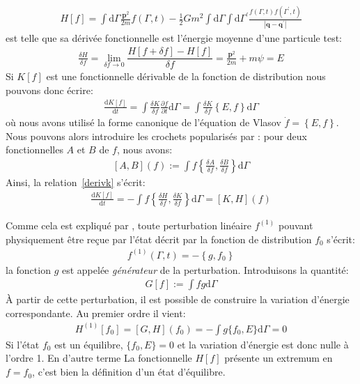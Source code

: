 \begin{align*}
	H \left[ f \right]  =
	\int \mathrm{d} {\Gamma}
		\frac{\mathbf{p}^{2}}{2m} f \left( {\Gamma},t \right)
	- \frac{1}{2} Gm^2 \int \mathrm{d} {\Gamma} \int\mathrm{d}{\Gamma}^{\prime}
		\frac{f \left({\Gamma},t \right) f\left( {\Gamma}^{\prime},t\right)}%
		{\left\vert \mathbf{q} - \mathbf{q}^{\prime} \right\vert }
\end{align*}
est telle que sa dérivée fonctionnelle est l'énergie moyenne d'une particule test:
\begin{align*}
	\frac{\delta H}{\delta f}=\lim_{\delta f \to 0}\dfrac{H\left[ f +\delta f\right]-H \left[ f \right]}{\delta f}
	= \frac{\mathbf{p}^{2}}{2m} + m \psi=E
\end{align*}
Si $K[f]$ est une fonctionnelle dérivable de la fonction de distribution nous pouvons donc écrire:
\begin{align}
	\frac{\mathrm{d} K[f]}{\mathrm{d} t}
	= \int \frac{\delta K}{\delta f}
		\frac{\partial f}{\partial t} \mathrm{d} \Gamma
	= \int \frac{\delta K}{\delta f} \left\{ E, f \right\} \mathrm{d} \Gamma
	\label{derivk}
\end{align}
où nous avons utilisé la forme canonique de l'équation de Vlasov $\dot f=\left\{ E, f \right\}$.
Nous pouvons alors introduire les crochets popularisés par \cite{morrison}: pour deux fonctionnelles $A$ et $B$ de $f$, nous avons:
\begin{align*}
	\left[ A, B \right](f) :=
	\int f \left\{
		\frac{\delta A}{\delta f}, \frac{\delta B}{\delta f}
	\right\} \mathrm{d} \Gamma
\end{align*}
Ainsi, la relation~\ref{derivk} s'écrit:
\begin{align}
	\frac{\mathrm{d} K[f]}{\mathrm{d} t}
	= - \int f \left\{
		\frac{\delta H}{\delta f}, \frac{\delta K}{\delta f}
	\right\} \mathrm{d} \Gamma
	= \left[K, H \right](f)
\end{align}

Comme cela est expliqué par \cite{kandrupstability}, toute perturbation linéaire $f^{(1)}$ pouvant physiquement être reçue par l'état décrit par la
fonction de distribution $f_0$ s'écrit:
\begin{align*}
	f^{(1)}\left(  {\Gamma},t \right) = -\left\{ g,f_{0}\right\}
\end{align*}
la fonction $g$ est appelée \emph{générateur} de la perturbation. Introduisons la quantité:
\begin{align*}
	G[f] := \int f g \mathrm{d} \Gamma
\end{align*}
À partir de cette perturbation, il est possible de construire la variation d'énergie correspondante. Au  premier ordre il vient:
\begin{align*}
	H^{(1)} [f_0] = \left[G, H \right](f_0)
	= - \int g \{ f_0, E \} \mathrm{d} \Gamma
	= 0
\end{align*}
Si l'état $f_0$ est un équilibre, $\{ f_0, E \} = 0$ et la variation d'énergie est donc nulle à l'ordre 1. En d'autre terme La fonctionnelle $H[f]$
présente un extremum en $f=f_0$, c'est bien la définition d'un état d'équilibre.

